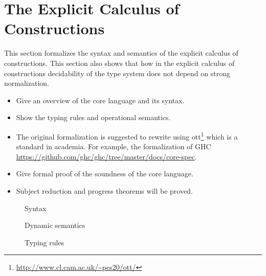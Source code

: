 \section{The Explicit Calculus of Constructions}
\label{sec:formal}


This section formalizes the syntax and semantics of the explicit calculus 
of constructions. This section also shows that how in the explicit 
calculus of constructions decidability of the type system does not 
depend on strong normalization.

\begin{itemize}
\item Give an overview of the core language and its syntax.
\item Show the typing rules and operational semantics.
\item The original formalization is suggested to rewrite using \textsf{ott}\footnote{\url{http://www.cl.cam.ac.uk/~pes20/ott/}} which is a standard in academia. For example, the formalization of GHC \url{https://github.com/ghc/ghc/tree/master/docs/core-spec}.
\item Give formal proof of the soundness of the core language.
\item Subject reduction and progress theorems will be proved.
\end{itemize}

\newcommand{\gram}[1]{\ottgrammartabular{#1\ottafterlastrule}}

\begin{figure}[ht]
    \gram{\otte\ottinterrule
          \otts\ottinterrule
          \ottG\ottinterrule
          \ottv}
    \caption{Syntax}
\end{figure}

\begin{figure}[ht]
    \ottdefnstep{}
    \caption{Dynamic semantics}
\end{figure}

\begin{figure}[ht]
    \ottdefnexpr{}
    \caption{Typing rules}
\end{figure}
